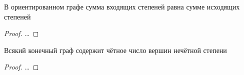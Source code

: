 \documentclass[a4paper, 14pt]{article}
\begin{document}
    \begin{lemma}
        В ориентированном графе сумма входящих степеней равна сумме исходящих степеней
    \end{lemma}
    \begin{proof}
        \dots
    \end{proof}

    \begin{lemma}
        Всякий конечный граф содержит чётное число вершин нечётной степени
    \end{lemma}
    \begin{proof}
        \dots
    \end{proof}

    

    
\end{document}
